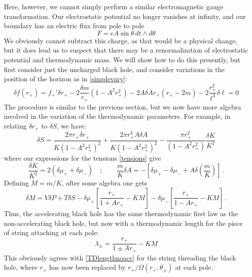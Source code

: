 \documentclass[
twoside,openright,frontopenright]{dmathesis}
\begin{document}
Here, however, we cannot simply perform a similar electromagnetic
gauge transformation. Our electrostatic potential no longer
vanishes at infinity, and our boundary has an electric flux from pole to pole
\begin{equation}
F = eA \sin\theta \, dt \wedge d\theta
\end{equation}
We obviously cannot subtract this charge, as that would be a physical change,
but it does lead us to suspect that there may be a renormalization of
electrostatic potential and thermodynamic mass. We will show how to do this
presently, but first consider just the uncharged black hole, and consider
variations in the position of the horizon as in \eqref{simplevary}:
\begin{equation}
\delta f(r_+) = f_+' \delta r_+  - 2 \frac{\delta m}{r_+} (1-A^2r_+^2)
- 2 A \delta A r_+ (r_+ - 2m) - 2 \frac{r_+^2}{\ell^3} \delta \ell = 0
\end{equation}
The procedure is similar to the previous section, but we now have
more algebra involved in the variation of the thermodynamic parameters.
For example, in relating $\delta r_+$ to $\delta S$, we have:
\begin{equation}
\delta S = \frac{2\pi r_+ \delta r_+}{K(1-A^2 r_+^2)^2} + 
\frac{2 \pi r_+^4 A\delta A}{K (1-A^2 r_+^2)^2} - 
\frac{\pi r_+^2}{(1-A^2 r_+^2)} \frac{\delta K}{K^2}
\end{equation}
where our expressions for the tensions \eqref{tensions} give
\begin{equation}
\frac{\delta K}{K^2} = 2 \left ( \delta \mu_+ + \delta \mu_- \right )
\quad ; \qquad \frac{m}{K} \delta A = - \left [
\delta \mu_+ - \delta \mu_- + A \delta (\frac{m}{K}) \right]\,.
\end{equation}
Defining $M=m/K$, after some algebra one gets
\begin{equation}
\delta M = V\delta P + T \delta S -
\delta \mu_+ \left [ \frac{r_+}{1+Ar_+} - KM \right ] -
\delta \mu_- \left [ \frac{r_+}{1-Ar_+} - KM \right ] \,.
\label{firstaccm}
\end{equation}
Thus, the accelerating black hole has the same thermodynamic first law
as the non-accelerating black hole, but now with a thermodynamic length
for the piece of string attaching at each pole:
\begin{equation}
\lambda_\pm = \frac{r_+}{1 \pm Ar_+} - KM
\end{equation}
This obviously agrees with \eqref{TDlengthnoacc} for the string
threading the black hole, where $r_+$ has now been replaced by
$r_+/\Omega(r_+,\theta_\pm)$ at each pole.
\end{document}
